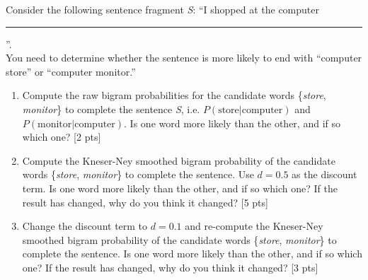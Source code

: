     Consider the following sentence fragment \emph{S}: ``I shopped at the computer \rule{1cm}{0.15mm}''. \\
    You need to determine whether the sentence is more likely to end with ``computer store'' or ``computer monitor.'' \\
    \begin{enumerate}
        \item 
        Compute the raw bigram probabilities for the candidate words \{\emph{store}, \emph{monitor}\} to complete the sentence \emph{S}, i.e. $P(\text{store} | \text{computer})$ and $P(\text{monitor} | \text{computer})$.
        Is one word more likely than the other, and if so which one? [2 pts]
        \item Compute the Kneser-Ney smoothed bigram probability of the candidate words \{\emph{store}, \emph{monitor}\} to complete the sentence.
        Use $d=0.5$ as the discount term.
        Is one word more likely than the other, and if so which one?
        If the result has changed, why do you think it changed? [5 pts]
        \item Change the discount term to $d=0.1$ and re-compute the Kneser-Ney smoothed bigram probability of the candidate words \{\emph{store}, \emph{monitor}\} to complete the sentence.
        Is one word more likely than the other, and if so which one?
        If the result has changed, why do you think it changed? [3 pts]
    \end{enumerate}

